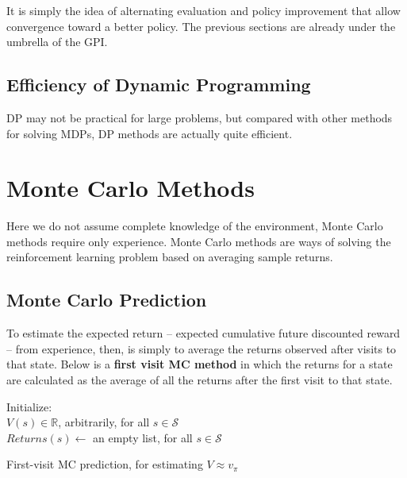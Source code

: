 \documentclass[11pt]{article}
\begin{document}
It is simply the idea of alternating evaluation and policy improvement that
allow convergence toward a better policy. The previous sections are already
under the umbrella of the GPI.

\subsection{Efficiency of Dynamic Programming}
\label{sec:orgcd91282}

DP may not be practical for large problems, but compared with other methods for
solving MDPs, DP methods are actually quite efficient.

\section{Monte Carlo Methods}
\label{sec:org0fb157d}

Here we do not assume complete knowledge of the environment, Monte Carlo methods
require only experience. Monte Carlo methods are ways of solving the
reinforcement learning problem based on averaging sample returns.

\subsection{Monte Carlo Prediction}
\label{sec:orgb2cd43d}

To estimate the expected return -- expected cumulative future discounted reward
-- from experience, then, is simply to average the returns observed after visits
to that state. Below is a \textbf{first visit MC method} in which the returns for a
state are calculated as the average of all the returns after the first visit to
that state.
\newline
\newline
\begin{algorithm}[H]
Initialize: \\
$V(s) \in \mathbb{R}$, arbitrarily, for all $s \in \mathcal{S}$ \\
$Returns(s) \leftarrow$ an empty list, for all $s \in \mathcal{S}$ \\
\;

\;

\caption{First-visit MC prediction, for estimating $V \approx v_{\pi}$}
\end{algorithm}
\end{document}
